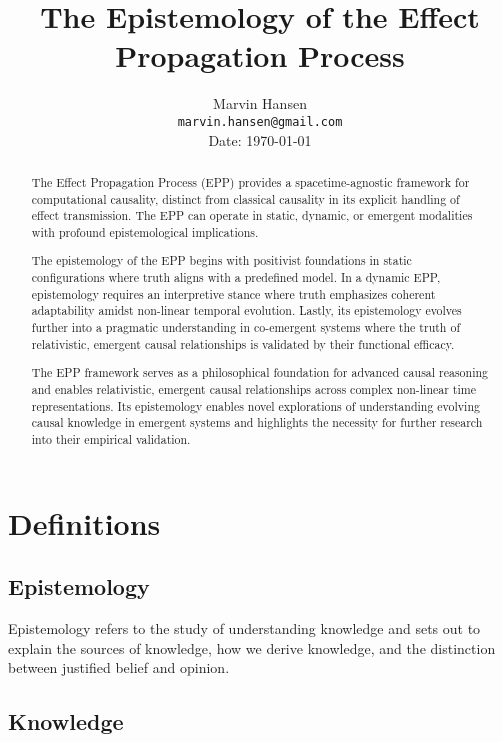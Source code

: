 \documentclass{article}
\title{The Epistemology of the Effect Propagation Process}
\author{
  Marvin Hansen \\
  \texttt{marvin.hansen@gmail.com} \\
   Date: \today
}
\begin{document}
\maketitle

\begin{abstract}
The Effect Propagation Process (EPP) provides a spacetime-agnostic framework for computational causality, distinct from classical causality in its explicit handling of effect transmission. The EPP can operate in static, dynamic, or emergent modalities with profound epistemological implications.


The epistemology of the EPP begins with positivist foundations in static configurations where truth aligns with a predefined model. In a dynamic EPP, epistemology requires an interpretive stance where truth emphasizes coherent adaptability amidst non-linear temporal evolution. Lastly, its epistemology evolves further into a pragmatic understanding in co-emergent systems where the truth of relativistic, emergent causal relationships is validated by their functional efficacy.


The EPP framework serves as a philosophical foundation for advanced causal reasoning and enables relativistic, emergent causal relationships across complex non-linear time representations. Its epistemology enables novel explorations of understanding evolving causal knowledge in emergent systems and highlights the necessity for further research into their empirical validation.
\end{abstract}

\section{Definitions}
\label{sec:Definitions}

\subsection{Epistemology}
\label{subsec:Def_Epistemology}

Epistemology refers to the study of understanding knowledge and sets out to explain the sources of knowledge, how we derive knowledge, and the distinction between justified belief and opinion\cite{sol2022understanding}.

\subsection{Knowledge}
\label{subsec:Def_Knowledge}
\end{document}

